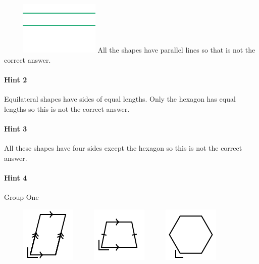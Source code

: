 \documentclass[twocolumn,10pt]{article}
\def\shrinkfactor{0.55}
\begin{document}
$\phantom{xxxx}$
\includegraphics[scale=\shrinkfactor]{figures/7cf1fbfb7516a57d37ad80007a3886c81c33f393.png}  
All the shapes have parallel lines so that is not the correct answer.

\paragraph{Hint 2}Equilateral shapes have sides of equal lengths.  Only the hexagon has equal lengths so this is not the correct answer.

\paragraph{Hint 3}All these shapes have four sides except the hexagon so this is not the correct answer.

\paragraph{Hint 4}Group One

$\phantom{xxxx}$
\includegraphics[scale=\shrinkfactor]{figures/fee7e4994ef0d10862a0f686587d8d2ba79bb13e.png}
$\phantom{xxxx}$
\includegraphics[scale=\shrinkfactor]{figures/0551b3aafe67b1364e8c26b46976f33448514e73.png}
$\phantom{xxxx}$
\includegraphics[scale=\shrinkfactor]{figures/86b2c3c3c0943d023a08a365d4a9966c85516b6a.png}
\end{document}
